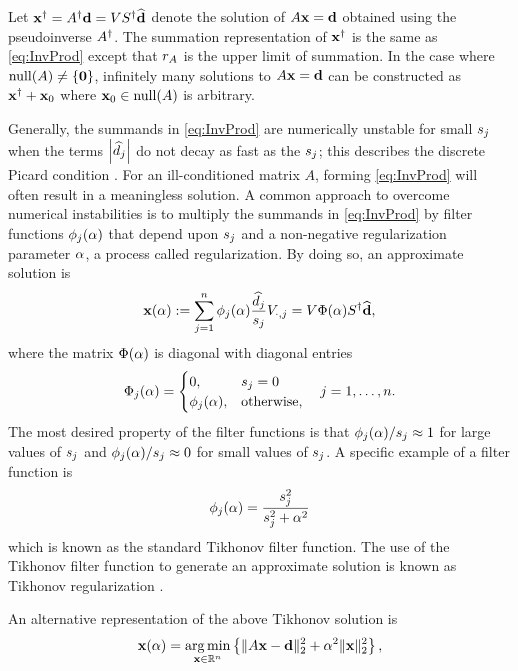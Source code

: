 \documentclass[12pt]{article}
\begin{document}
Let ${\mathbf{x}}^\dagger = {A}^\dagger\mathbf{d} = V{S}^\dagger\widehat{\mathbf{d}}$ denote the solution of $A\mathbf{x} = \mathbf{d}$ obtained using the pseudoinverse ${A}^\dagger$. The summation representation of ${\mathbf{x}}^\dagger$ is the same as \eqref{eq:InvProd} except that $r_A$ is the upper limit of summation. In the case where $\operatorname{null}(A) \neq \{\bm{0}\}$, infinitely many solutions to $A\mathbf{x} = \mathbf{d}$ can be constructed as ${\mathbf{x}}^\dagger + \mathbf{x}_0$ where $\mathbf{x}_0 \in \operatorname{null}(A)$ is arbitrary. \par
Generally, the summands in \eqref{eq:InvProd} are numerically unstable for small $s_j$ when the terms $\left|\widehat{d}_j\right|$ do not decay as fast as the $s_j$; this describes the discrete Picard condition \cite{Hansen:98}. For an ill-conditioned matrix $A$, forming \eqref{eq:InvProd} will often result in a meaningless solution. A common approach to overcome numerical instabilities is to multiply the summands in \eqref{eq:InvProd} by filter functions $\phi_j(\alpha)$ that depend upon $s_j$ and a non-negative regularization parameter $\alpha$, a process called regularization. By doing so, an approximate solution is
\begin{equation}
\label{eq:ApproxSol}
\mathbf{x}(\alpha) := \sum_{j=1}^{n} \phi_j(\alpha) \frac{\widehat{d}_j}{s_j}V_{\cdot,j}  = V\Phi(\alpha){S}^\dagger\widehat{\mathbf{d}},
\end{equation}
where the matrix $\Phi(\alpha)$ is diagonal with diagonal entries 
\[\Phi_j(\alpha) = \begin{cases}
0, & s_j = 0 \\
\phi_j(\alpha), & \text{otherwise,}
\end{cases} \quad j = 1,\ldots,n.\]
The most desired property of the filter functions is that $\phi_j(\alpha)/s_j \approx 1$  for large values of $s_j$ and $\phi_j(\alpha)/s_j \approx 0$ for small values of $s_j$. A specific example of a filter function is
\begin{equation}
\label{eq:TikFilt}
\phi_j(\alpha)  = \frac{s_j^2}{s_j^2 + \alpha^2}
\end{equation}
which is known as the standard Tikhonov filter function. The use of the Tikhonov filter function to generate an approximate solution is known as Tikhonov regularization \cite{Tikh1963}. \par
An alternative representation of the above Tikhonov solution is
\begin{equation}
\label{eq:Damped LS}
\mathbf{x}(\alpha) = \operatorname*{arg\,min}_{\mathbf{x} \in \mathbb{R}^n} \left\{\|A\mathbf{x} - \mathbf{d}\|_2^2 + \alpha^2\|\mathbf{x}\|_2^2\right\},
\end{equation}
\end{document}
